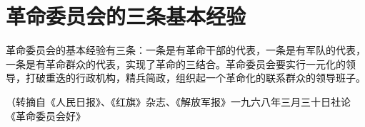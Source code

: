 \section{革命委员会的三条基本经验}

革命委员会的基本经验有三条：一条是有革命干部的代表，一条是有军队的代表，一条是有革命群众的代表，实现了革命的三结合。革命委员会要实行一元化的领导，打破重迭的行政机构，精兵简政，组织起一个革命化的联系群众的领导班子。

{\raggedleft （转摘自《人民日报》、《红旗》杂志、《解放军报》一九六八年三月三十日社论《革命委员会好》\par}
